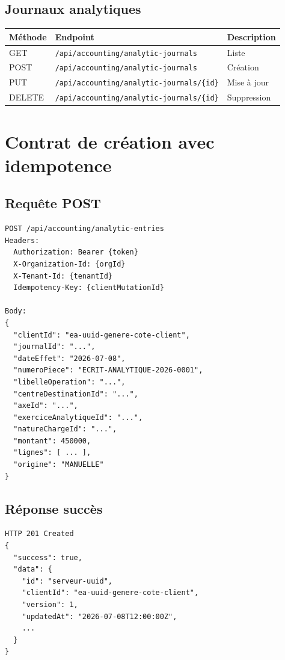 \documentclass[12pt,a4paper]{report}
\begin{document}
\subsection{Journaux analytiques}

\begin{longtable}{@{}p{2cm}p{5.5cm}p{5cm}@{}}
\hline
\textbf{Méthode} & \textbf{Endpoint} & \textbf{Description} \\
\hline

GET & \texttt{/api/accounting/analytic-journals} & Liste \\
POST & \texttt{/api/accounting/analytic-journals} & Création \\
PUT & \texttt{/api/accounting/analytic-journals/\{id\}} & Mise à jour \\
DELETE & \texttt{/api/accounting/analytic-journals/\{id\}} & Suppression \\
\hline
\end{longtable}

\section{Contrat de création avec idempotence}

\subsection{Requête POST}

\begin{verbatim}
POST /api/accounting/analytic-entries
Headers:
  Authorization: Bearer {token}
  X-Organization-Id: {orgId}
  X-Tenant-Id: {tenantId}
  Idempotency-Key: {clientMutationId}

Body:
{
  "clientId": "ea-uuid-genere-cote-client",
  "journalId": "...",
  "dateEffet": "2026-07-08",
  "numeroPiece": "ECRIT-ANALYTIQUE-2026-0001",
  "libelleOperation": "...",
  "centreDestinationId": "...",
  "axeId": "...",
  "exerciceAnalytiqueId": "...",
  "natureChargeId": "...",
  "montant": 450000,
  "lignes": [ ... ],
  "origine": "MANUELLE"
}
\end{verbatim}

\subsection{Réponse succès}

\begin{verbatim}
HTTP 201 Created
{
  "success": true,
  "data": {
    "id": "serveur-uuid",
    "clientId": "ea-uuid-genere-cote-client",
    "version": 1,
    "updatedAt": "2026-07-08T12:00:00Z",
    ...
  }
}
\end{verbatim}
\end{document}
